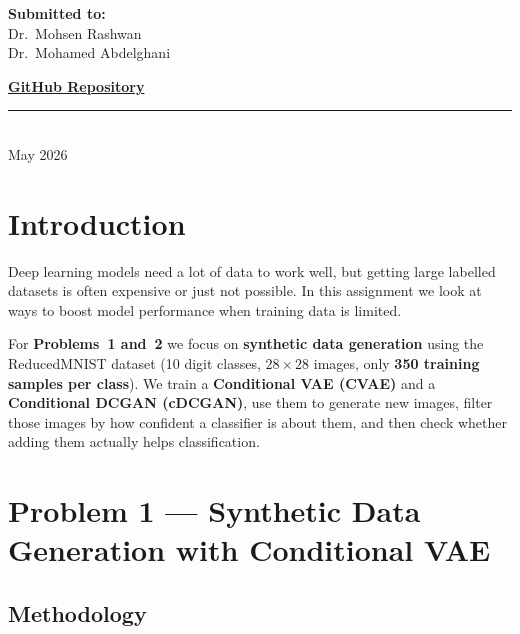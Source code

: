 \documentclass[12pt, a4paper]{article}
\begin{document}
\begin{titlepage}
\begin{center}
        \vspace{2cm}

        \textbf{Submitted to:} \\
        Dr.\ Mohsen Rashwan \\
        Dr.\ Mohamed Abdelghani \\
    \end{center}

    \vfill

    \faGithub\hspace{0.4em}\href{https://github.com/al-sakka/NN_Assignments/tree/main/Assignment_3}{\textbf{GitHub Repository}}

    \vfill
    \rule{0.3\linewidth}{0.2mm} \\
    {\large May 2026}
\end{titlepage}

\tableofcontents
\newpage

\section{Introduction}

Deep learning models need a lot of data to work well, but getting large labelled datasets
is often expensive or just not possible.  In this assignment we look at ways to boost model
performance when training data is limited.

For \textbf{Problems~1 and~2} we focus on \textbf{synthetic data generation} using the
ReducedMNIST dataset (10 digit classes, $28\times28$ images, only \textbf{350 training
samples per class}).  We train a \textbf{Conditional VAE (CVAE)} and a
\textbf{Conditional DCGAN (cDCGAN)}, use them to generate new images, filter those images
by how confident a classifier is about them, and then check whether adding them actually
helps classification.

\section{Problem 1 --- Synthetic Data Generation with Conditional VAE}

\subsection{Methodology}
\end{document}
